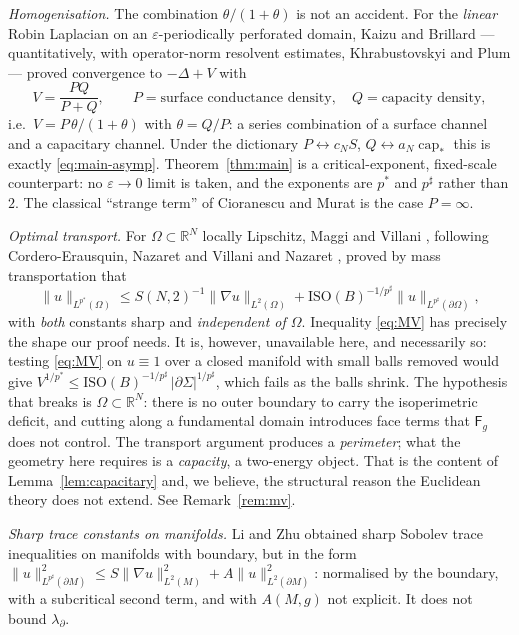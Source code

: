 \documentclass[11pt,reqno]{amsart}
\theoremstyle{plain}
\theoremstyle{definition}
\newcommand{\R}{\mathbb{R}}
\newcommand{\aN}{a_N}
\newcommand{\cN}{c_N}
\newcommand{\pstar}{p^{*}}
\newcommand{\psharp}{p^{\sharp}}
\newcommand{\cpstar}{\operatorname{cap}_{*}}
\newcommand{\Fq}{\mathsf{F}}
\begin{document}
\emph{Homogenisation.} The combination $\theta/(1+\theta)$ is not an accident. For
the \emph{linear} Robin Laplacian on an $\varepsilon$-periodically perforated
domain, Kaizu \cite{Kaizu1985a,Kaizu1985b,Kaizu1986,Kaizu1989} and Brillard
\cite{Brillard1988} — quantitatively, with operator-norm resolvent estimates,
Khrabustovskyi and Plum \cite{KhrabustovskyiPlum2022} — proved convergence to
$-\Delta+V$ with
\[
   V=\frac{PQ}{P+Q},\qquad
   P=\text{surface conductance density},\quad
   Q=\text{capacity density},
\]
i.e.\ $V=P\,\theta/(1+\theta)$ with $\theta=Q/P$: a series combination of a surface
channel and a capacitary channel. Under the dictionary $P\leftrightarrow\cN S$,
$Q\leftrightarrow\aN\cpstar$ this is exactly \eqref{eq:main-asymp}.
Theorem~\ref{thm:main} is a critical-exponent, fixed-scale counterpart: no
$\varepsilon\to0$ limit is taken, and the exponents are $\pstar$ and $\psharp$
rather than $2$. The classical ``strange term'' of Cioranescu and Murat
\cite{CioranescuMurat1997} is the case $P=\infty$.

\emph{Optimal transport.} For $\Omega\subset\R^N$ locally Lipschitz,
Maggi and Villani \cite{MaggiVillani2005,MaggiVillani2008}, following
Cordero-Erausquin, Nazaret and Villani \cite{CNV2004} and Nazaret
\cite{Nazaret2006}, proved by mass transportation that
\begin{equation}
\label{eq:MV}
  \|u\|_{L^{\pstar}(\Omega)}\le S(N,2)^{-1}\|\nabla u\|_{L^2(\Omega)}
      +\mathrm{ISO}(B)^{-1/\psharp}\|u\|_{L^{\psharp}(\partial\Omega)},
\end{equation}
with \emph{both} constants sharp and \emph{independent of $\Omega$}. Inequality
\eqref{eq:MV} has precisely the shape our proof needs. It is, however,
unavailable here, and necessarily so: testing \eqref{eq:MV} on $u\equiv1$ over a
closed manifold with small balls removed would give
$V^{1/\pstar}\le\mathrm{ISO}(B)^{-1/\psharp}\,|\partial\Sigma|^{1/\psharp}$, which
fails as the balls shrink. The hypothesis that breaks is $\Omega\subset\R^N$:
there is no outer boundary to carry the isoperimetric deficit, and cutting along a
fundamental domain introduces face terms that $\Fq_g$ does not control. The
transport argument produces a \emph{perimeter}; what the geometry here requires is
a \emph{capacity}, a two-energy object. That is the content of
Lemma~\ref{lem:capacitary} and, we believe, the structural reason the Euclidean
theory does not extend. See Remark~\ref{rem:mv}.

\emph{Sharp trace constants on manifolds.} Li and Zhu \cite{LiZhu1997} obtained
sharp Sobolev trace inequalities on manifolds with boundary, but in the form
$\|u\|^2_{L^{\psharp}(\partial M)}\le S\|\nabla u\|^2_{L^2(M)}+A\|u\|^2_{L^2(\partial M)}$:
normalised by the boundary, with a subcritical second term, and with $A(M,g)$ not
explicit. It does not bound $\lambda_\partial$.
\end{document}
